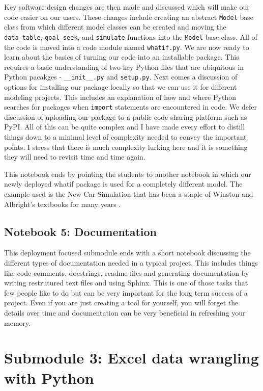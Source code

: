 \documentclass[ited,blindrev]{informs3}              %
\newcommand{\code}[1]{\texttt{#1}}
\begin{document}
Key software design changes are then made and discussed which will make our code easier on our users. These changes include creating an abstract \code{Model} base class from which different model classes can be created and moving the \code{data_table}, \code{goal_seek}, and \code{simulate} functions into the \code{Model} base class. All of the code is moved into a code module named \code{whatif.py}. We are now ready to learn about the basics of turning our code into an installable package. This requires a basic understanding of two key Python files that are ubiquitous in Python pacakges - \code{__init__.py} and \code{setup.py}. Next comes a discussion of options for installing our package locally so that we can use it for different modeling projects. This includes an explanation of how and where Python searches for packages when \code{import} statements are encountered in code. We defer discussion of uploading our package to a public code sharing platform such as PyPI. All of this can be quite complex and I have made every effort to distill things down to a minimal level of complexity needed to convey the important points. I stress that there is much complexity lurking here and it is something they will need to revisit time and time again.

This notebook ends by pointing the students to another notebook in which our newly deployed whatif package is used for a completely different model. The example used is the New Car Simulation that has been a staple of Winston and Albright's textbooks for many years \cite{bibid}.

\subsection{Notebook 5: Documentation}

This deployment focused submodule ends with a short notebook discussing the different types of documentation needed in a typical project. This includes things like code comments, docstrings, readme files and generating documentation by writing restrutured text files and using Sphinx. This is one of those tasks that few people like to do but can be very important for the long term success of a project. Even if you are just creating a tool for yourself, you will forget the details over time and documentation can be very beneficial in refreshing your memory. 

\section{Submodule 3: Excel data wrangling with Python}
\end{document}
